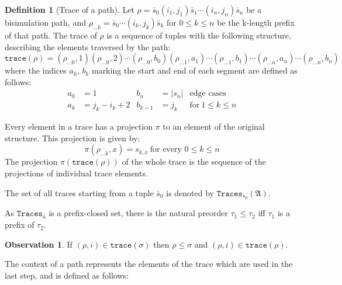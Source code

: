 \documentclass[draft]{scrartcl}
\theoremstyle{definition}
\newtheorem{definition}[theorem]{Definition}
\newtheorem{observation}[theorem]{Observation}
\newcommand{\trace}[1]{\mathtt{trace}(#1)}
\begin{document}
\begin{samepage}
\begin{definition}[Trace of a path]
  Let $\rho = \bar{s}_{0}(i_{1}, j_{1})\bar{s}_{1}\cdots{}(i_{n}, j_{n})\bar{s}_{n}$ be a bisimulation path, and $\rho_{\ldots{}k} = \bar{s}_{0}\cdots(i_{k},j_{k})\bar{s}_{k}$ for $0 \le k \le n$ be the k-length prefix of that path.
  The trace of $\rho$ is a sequence of tuples with the following structure, describing the elements traversed by the path:
  \begin{equation*}
  \trace{\rho} = (\rho_{\ldots{}0}, 1)(\rho_{\ldots{}0}, 2)\cdots{}(\rho_{\ldots{}0}, b_{0})(\rho_{\ldots{}1}, a_{1})\cdots{}(\rho_{\ldots{}1}, b_{1})\cdots(\rho_{\ldots{}n}, a_{n})\cdots(\rho_{\ldots{}n}, b_{n})
  \end{equation*}
  where the indices $a_{k}$, $b_{k}$ marking the start and end of each segment are defined as follows:
  \begin{align*}
    a_{0} &= 1                   & b_{n} &= |s_{n}| & \text{edge cases} \\
    a_{k} &= j_{k} - i_{k} + 2    &  b_{k-1} &= j_{k} & \text{for}\ 1 \le k \le n
  \end{align*}

  Every element in a trace has a projection $\pi$ to an element of the original structure.
  This projection is given by:
  \begin{equation*}
    \pi(\rho_{\ldots{}k},x) = s_{k,x}\ \text{for every $0 \le k \le n$}
  \end{equation*}
  The projection $\pi(\trace{\rho})$ of the whole trace is the sequence of the projections of individual trace elements.

  The set of all traces starting from a tuple $\bar{s}_{0}$ is denoted by $\mathtt{Traces}_{\bar{s}_{0}}(\mathfrak{A})$.
\end{definition}
\end{samepage}

As $\mathtt{Traces}_{\bar{a}}$ is a prefix-closed set, there is the natural preorder $\tau_{1} \le \tau_{2}$ iff $\tau_{1}$ is a prefix of $\tau_{2}$.

\begin{observation}
  If $(\rho,i) \in \trace{\sigma}$ then $\rho \le \sigma$ and $(\rho, i) \in \trace{\rho}$.
\end{observation}

The context of a path represents the elements of the trace which are used in the last step, and is defined as follows:
\end{document}
